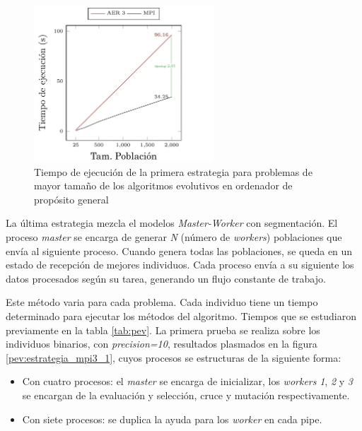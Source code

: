 		\begin{figure}[!h]
			\centering
			\includegraphics[width=0.6\textwidth]{images/chapter_4/pev_mpi1}
			\caption{Tiempo de ejecución de la primera estrategia para problemas de mayor tamaño de los algoritmos evolutivos en ordenador de propósito general}
			\label{fig:pev_mpi1_2}			
		\end{figure}
	
	
		

	
		La última estrategia mezcla el modelos \textit{Master-Worker} con segmentación. El proceso \textit{master} se encarga de generar \textit{N} (número de \textit{workers}) poblaciones que envía al siguiente proceso. Cuando genera todas las poblaciones, se queda en un estado de recepción de mejores individuos. Cada proceso envía a su siguiente los datos procesados según su tarea, generando un flujo constante de trabajo.
		
		Este método varia para cada problema. Cada individuo tiene un tiempo determinado para ejecutar los métodos del algoritmo. Tiempos que se estudiaron previamente en la tabla \ref{tab:pev}. La primera prueba se realiza sobre los individuos binarios, con \textit{precision=10}, resultados plasmados en la figura \ref{pev:estrategia_mpi3_1}, cuyos procesos se estructuras de la siguiente forma:
		
		\begin{itemize}
			\item Con cuatro procesos: el \textit{master} se encarga de inicializar, los \textit{workers} \textit{1}, \textit{2} y \textit{3} se encargan de la evaluación y selección, cruce y mutación respectivamente.
			\item Con siete procesos: se duplica la ayuda para los \textit{worker} en cada pipe. 
		\end{itemize}
		
